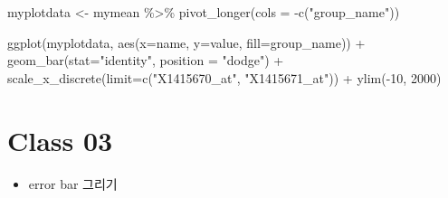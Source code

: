 \documentclass[
]{book}
\newenvironment{Shaded}{\begin{snugshade}}{\end{snugshade}}
\newcommand{\AttributeTok}[1]{\textcolor[rgb]{0.77,0.63,0.00}{#1}}
\newcommand{\DecValTok}[1]{\textcolor[rgb]{0.00,0.00,0.81}{#1}}
\newcommand{\FunctionTok}[1]{\textcolor[rgb]{0.00,0.00,0.00}{#1}}
\newcommand{\NormalTok}[1]{#1}
\newcommand{\OtherTok}[1]{\textcolor[rgb]{0.56,0.35,0.01}{#1}}
\newcommand{\SpecialCharTok}[1]{\textcolor[rgb]{0.00,0.00,0.00}{#1}}
\newcommand{\StringTok}[1]{\textcolor[rgb]{0.31,0.60,0.02}{#1}}
\providecommand{\tightlist}{%
  \setlength{\itemsep}{0pt}\setlength{\parskip}{0pt}}
\begin{document}
\begin{Shaded}
\begin{Highlighting}[]
\NormalTok{myplotdata }\OtherTok{\textless{}{-}}\NormalTok{ mymean }\SpecialCharTok{\%\textgreater{}\%} 
  \FunctionTok{pivot\_longer}\NormalTok{(}\AttributeTok{cols =} \SpecialCharTok{{-}}\FunctionTok{c}\NormalTok{(}\StringTok{"group\_name"}\NormalTok{))}
  
\FunctionTok{ggplot}\NormalTok{(myplotdata, }\FunctionTok{aes}\NormalTok{(}\AttributeTok{x=}\NormalTok{name, }\AttributeTok{y=}\NormalTok{value, }\AttributeTok{fill=}\NormalTok{group\_name)) }\SpecialCharTok{+}
  \FunctionTok{geom\_bar}\NormalTok{(}\AttributeTok{stat=}\StringTok{"identity"}\NormalTok{, }\AttributeTok{position =} \StringTok{"dodge"}\NormalTok{) }\SpecialCharTok{+}
  \FunctionTok{scale\_x\_discrete}\NormalTok{(}\AttributeTok{limit=}\FunctionTok{c}\NormalTok{(}\StringTok{"X1415670\_at"}\NormalTok{, }\StringTok{"X1415671\_at"}\NormalTok{)) }\SpecialCharTok{+}
  \FunctionTok{ylim}\NormalTok{(}\SpecialCharTok{{-}}\DecValTok{10}\NormalTok{, }\DecValTok{2000}\NormalTok{)}
\end{Highlighting}
\end{Shaded}

\hypertarget{class-03}{%
\section{Class 03}\label{class-03}}

\begin{itemize}
\tightlist
\item
  error bar 그리기
\end{itemize}
\end{document}

